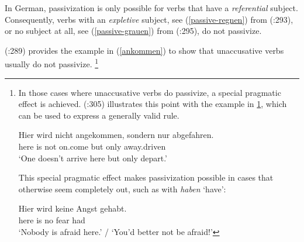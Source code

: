 \documentclass[output=paper]{langsci/langscibook}
\begin{document}
\begin{exe}
\ex
\begin{xlist}
\end{xlist}
\end{exe}

In   German, passivization is only possible for verbs that have a \textit{referential} subject. Consequently, verbs with an  \textit{expletive} subject, see (\ref{passive-regnen}) from \citeauthor{Mueller:13} (\citeyear{Mueller:13}:293), or no subject at all, see (\ref{passive-grauen}) from \citeauthor{Mueller:13} (\citeyear{Mueller:13}:295), do not passivize.

\begin{exe}
\end{exe}

\begin{exe}
\ex\label{passive-grauen}
\begin{xlist}
\end{xlist}
\end{exe}

\citeauthor{Mueller:13} (\citeyear{Mueller:13}:289) provides the example in (\ref{ankommen}) to show that unaccusative verbs usually do not passivize.%
\footnote{\label{fn-unaccusative-passive}In those cases where unaccusative verbs do passivize, a special pragmatic effect is achieved.
\citeauthor{Mueller:13} (\citeyear{Mueller:13}:305) illustrates this point with the example in \ref{directive-ankommen}, which can be used to express a gene\-rally valid rule.

\ea
\gll Hier wird nicht angekommen, sondern nur abgefahren.\\
here is not on.come but only away.driven\\
\glt `One doesn't arrive here but only depart.' \label{directive-ankommen}
\z

This special pragmatic effect makes passivization possible in cases that otherwise seem completely out, such as with \textit{haben} `have':

\ea
\gll Hier wird keine Angst gehabt.\\
here is no fear had\\
\glt `Nobody is afraid here.' / `You'd better not be afraid!'
\z
}
\end{document}
